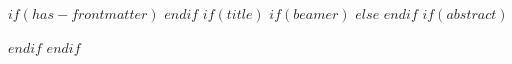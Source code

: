 $if(has-frontmatter)$
\frontmatter
$endif$
$if(title)$
$if(beamer)$
\frame{\titlepage}
$else$
\makeheader
$endif$
$if(abstract)$
\begin{abstract}
$abstract$
\end{abstract}
$endif$
$endif$